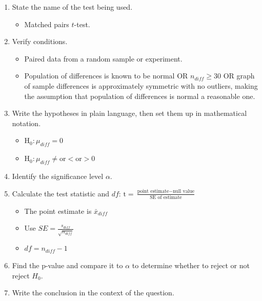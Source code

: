 \begin{termBox}{
\begin{enumerate}
\setlength{\itemsep}{0mm}
\item State the name of the test being used.\vspace{-1.5mm}
\begin{itemize}
\setlength{\itemsep}{0mm}
\item Matched pairs $t$-test.
\end{itemize}
\item Verify conditions.\vspace{-1.5mm}
\begin{itemize}
\setlength{\itemsep}{0mm}
\item Paired data from a random sample or experiment.
\item Population of differences is known to be normal OR $n_{diff}\ge 30$ OR graph of sample differences is approximately symmetric with no outliers, making the assumption that population of differences is normal a reasonable one.
\end{itemize}
\item Write the hypotheses in plain language, then set them up in mathematical notation.\vspace{-1.5mm}
\begin{itemize}
\setlength{\itemsep}{0mm}
\item H$_0: \mu_{diff}=0$
\item H$_0: \mu_{diff} \ne \text{or} < \text{or} > 0$
\end{itemize}
\item Identify the significance level $\alpha$.
\item Calculate the test statistic and $df$: $\text{t} = \frac{\text{point estimate} - \text{null value}}{\text{SE of estimate}}$
\begin{itemize}
\setlength{\itemsep}{0mm}
\item The point estimate is $\bar{x}_{diff}$
\item Use $SE = \frac{s_{diff}}{\sqrt{n_{diff}}}$
\item $df=n_{diff}-1$
\end{itemize}
\item Find the p-value and compare it to $\alpha$ to determine whether to reject or not reject $H_0$.
\item Write the conclusion in the context of the question.
\end{enumerate}}
\end{termBox}

